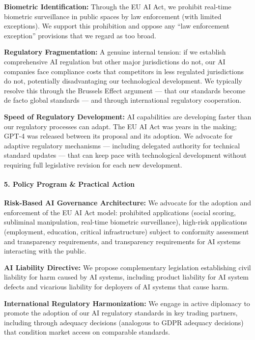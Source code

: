 \textbf{Biometric Identification:} Through the EU AI Act, we prohibit
real-time biometric surveillance in public spaces by law enforcement
(with limited exceptions). We support this prohibition and oppose any
``law enforcement exception'' provisions that we regard as too broad.

\textbf{Regulatory Fragmentation:} A genuine internal tension: if we
establish comprehensive AI regulation but other major jurisdictions do
not, our AI companies face compliance costs that competitors in less
regulated jurisdictions do not, potentially disadvantaging our
technological development. We typically resolve this through the
Brussels Effect argument --- that our standards become de facto global
standards --- and through international regulatory cooperation.

\textbf{Speed of Regulatory Development:} AI capabilities are developing
faster than our regulatory processes can adapt. The EU AI Act was years
in the making; GPT-4 was released between its proposal and its adoption.
We advocate for adaptive regulatory mechanisms --- including delegated
authority for technical standard updates --- that can keep pace with
technological development without requiring full legislative revision
for each new development.

\paragraph{5. Policy Program \& Practical
Action}\label{policy-program-practical-action-9}

\textbf{Risk-Based AI Governance Architecture:} We advocate for the
adoption and enforcement of the EU AI Act model: prohibited applications
(social scoring, subliminal manipulation, real-time biometric
surveillance), high-risk applications (employment, education, critical
infrastructure) subject to conformity assessment and transparency
requirements, and transparency requirements for AI systems interacting
with the public.

\textbf{AI Liability Directive:} We propose complementary legislation
establishing civil liability for harm caused by AI systems, including
product liability for AI system defects and vicarious liability for
deployers of AI systems that cause harm.

\textbf{International Regulatory Harmonization:} We engage in active
diplomacy to promote the adoption of our AI regulatory standards in key
trading partners, including through adequacy decisions (analogous to
GDPR adequacy decisions) that condition market access on comparable
standards.

